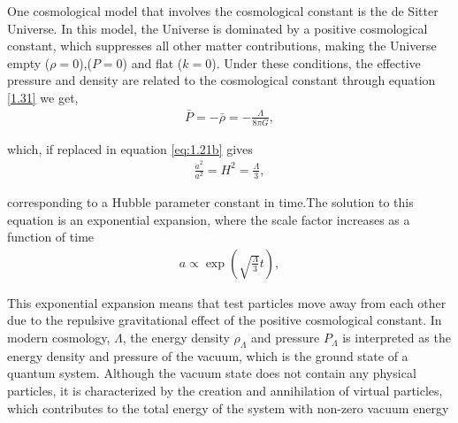 One cosmological model that involves the cosmological constant is the de Sitter Universe. In this model, the Universe is dominated by a positive cosmological constant, which suppresses all other matter contributions, making the Universe empty ($\rho=0$),($P = 0$) and flat ($k=0$). Under these conditions, the effective pressure and density are related to the cosmological constant through equation \ref{1.31} we get,
\begin{align}
   \bar{P}=-\bar{\rho}=-\frac{\Lambda}{8 \pi G}, \label{1.32}
\end{align}

which, if replaced in equation \ref{eq:1.21b} gives
\begin{align}
    \frac{\dot{a}^2}{a^2}=H^2=\frac{\Lambda}{3},\label{1.33}
\end{align}

corresponding to a Hubble parameter constant in time.The solution to
this equation is an exponential expansion, where the scale factor increases as a function of time
\begin{align}
    a \propto \exp \left(\sqrt{\frac{\Lambda}{3}} t\right),\label{1.34}
\end{align}


This exponential expansion means that test particles move away from
each other due to the repulsive gravitational effect of the positive cosmological constant.
In modern cosmology, $\Lambda$, the energy density $\rho_{\Lambda}$ and pressure $P_{\Lambda}$ is interpreted as the energy density and pressure of the vacuum, which is the ground state of a quantum system. Although the vacuum state does not
contain any physical particles, it is characterized by the creation and annihilation of virtual particles, which contributes to the total energy of the system with non-zero vacuum energy








